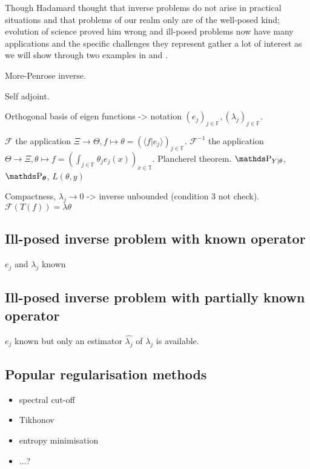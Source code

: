 Though Hadamard thought that inverse problems do not arise in practical situations and that problems of our realm only are of the well-posed kind; evolution of science proved him wrong and ill-posed problems now have many applications and the specific challenges they represent gather a lot of interest as we will show through two examples in  and .

\medskip

More-Penrose inverse.

Self adjoint.

Orthogonal basis of eigen functions  -> notation $(e_{j})_{j \in \mathds{F}}, \left(\lambda_{j}\right)_{j \in \mathds{F}}$.

$\mathcal{F}$ the application $\Xi \rightarrow \Theta, f \mapsto \theta = (\langle f \vert e_{j} \rangle)_{j \in \mathds{F}}$.
$\mathcal{F}^{-1}$ the application $\Theta \rightarrow \Xi, \theta \mapsto f = (\int_{j \in \mathds{F}} \theta_{j} e_{j}(x))_{x \in \mathds{T}}$.
Plancherel theorem.
$\P_{Y \vert \theta}$, $\P_{\boldsymbol{\theta}}$, $L(\theta, y)$

Compactness, $\lambda_{j} \rightarrow 0$ -> inverse unbounded (condition 3 not check).
$\mathcal{F}(T(f)) = \lambda \theta$

\subsection{Ill-posed inverse problem with known operator}\label{INTRO_INVERSE_KNOWN}
$e_{j}$ and $\lambda_{j}$ known

\subsection{Ill-posed inverse problem with partially known operator}\label{INTRO_INVERSE_UNKNOWN}
$e_{j}$ known but only an estimator $\widehat{\lambda_{j}}$ of $\lambda_{j}$ is available.
%

\subsection{Popular regularisation methods}\label{INTRO_INVERSE_REGULARISE}
\begin{itemize}
\item spectral cut-off
\item Tikhonov
\item entropy minimisation
\item ...?
\end{itemize}